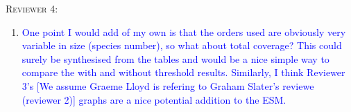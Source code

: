 \documentclass[12pt,letterpaper]{article}
\renewcommand{\section}[1]{%
\bigskip
\begin{center}
\begin{Large}
\normalfont\scshape #1
\medskip
\end{Large}
\end{center}}
\begin{document}

\section{Reviewer 4:}
\begin{enumerate}
\item{\textcolor{blue}{One point I would add of my own is that the orders used are obviously very variable in size (species number), so what about total coverage?
This could surely be synthesised from the tables and would be a nice simple way to compare the with and without threshold results.
Similarly, I think Reviewer 3’s [We assume Graeme Lloyd is refering to Graham Slater's reviewe (reviewer 2)] %
 graphs are a nice potential addition to the ESM.}}
\end{enumerate}
\end{document}
